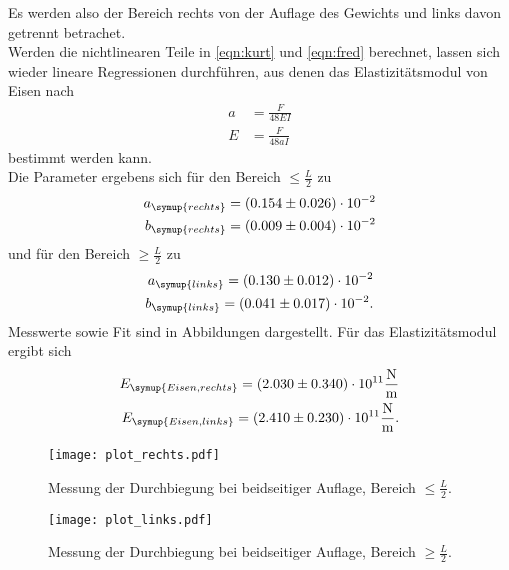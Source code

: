   \noindent Es werden also der Bereich rechts von der Auflage des Gewichts und links davon 
  getrennt betrachet.\\
  Werden die nichtlinearen Teile in \eqref{eqn:kurt} und \eqref{eqn:fred} berechnet, lassen sich wieder lineare 
  Regressionen durchführen, aus denen das Elastizitätsmodul von Eisen nach 
  \begin{align*}
    a &= \frac{F}{48 E I} \\
    E &= \frac{F}{48 a I}
  \end{align*}
  bestimmt werden kann.\\
  Die Parameter ergebens sich für den Bereich $\leq \frac{L}{2}$ zu 
  \begin{align*}
    a_{\symup{rechts}} &= \left( 0.154 \pm 0.026 \right) \cdot 10^{-2}\\
    b_{\symup{rechts}} &= \left( 0.009 \pm 0.004 \right) \cdot 10^{-2}\\
  \end{align*}
  und für den Bereich $\geq \frac{L}{2}$ zu 
  \begin{align*}
    a_{\symup{links}} = \left( 0.130 \pm 0.012 \right) \cdot 10^{-2}\\
    b_{\symup{links}} = \left( 0.041 \pm 0.017 \right) \cdot 10^{-2}.\\
  \end{align*}
  Messwerte sowie Fit sind in Abbildungen dargestellt.
  Für das Elastizitätsmodul ergibt sich
  \begin{align*}
    E_{\symup{Eisen, rechts}} = \left( 2.030 \pm 0.340 \right) \cdot 10^{11} \si{\newton\per\m}\\
    E_{\symup{Eisen, links}} = \left( 2.410 \pm 0.230 \right) \cdot 10^{11} \si{\newton\per\m}.\\
  \end{align*}

  \begin{figure}
    \centering
    \texttt{[image: plot\_rechts.pdf]}
    \caption{Messung der Durchbiegung bei beidseitiger Auflage, Bereich $\leq \frac{L}{2}$.}
    \label{fig:rechts}
  \end{figure}

  \begin{figure}
    \centering
    \texttt{[image: plot\_links.pdf]}
    \caption{Messung der Durchbiegung bei beidseitiger Auflage, Bereich $\geq \frac{L}{2}$.}
    \label{fig:links}
  \end{figure}